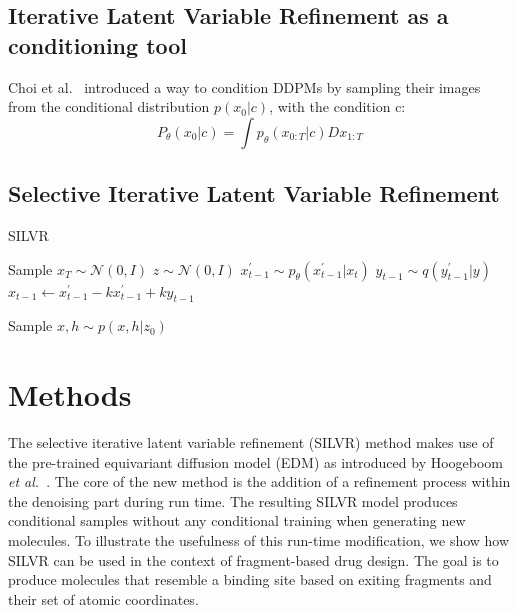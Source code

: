 \documentclass[journal=jacsat,manuscript=article]{achemso}
\begin{document}
\subsection{Iterative Latent Variable Refinement as a conditioning tool}
Choi et al.~\cite{choi2021ilvr} introduced a way to condition DDPMs by sampling their images from the conditional distribution $p(x_0|c)$, with the condition c:
\begin{equation}
    P_\theta(x_0|c) = \int p_\theta(x_{0:T}|c)Dx_{1:T}
\end{equation}

\subsection{Selective Iterative Latent Variable Refinement}

\begin{algorithm}
\caption{SILVR}\label{alg:cap}
\begin{algorithmic}
\State Sample $x_T \sim \mathcal{N}(0,I)$
    \State $z \sim \mathcal{N}(0,I)$
    \State $x_{t-1}^\prime \sim p_\theta(x_{t-1}^\prime|x_t)$
    \State $y_{t-1} \sim q(y_{t-1}^\prime|y)$
    \State $x_{t-1} \gets x_{t-1}^\prime - k x_{t-1}^\prime +k y_{t-1}$ 

\EndFor
\State Sample $x,h \sim p(x,h|z_0)$ 
\end{algorithmic}
\end{algorithm}















\section{Methods}
The selective iterative latent variable refinement (SILVR) method makes use of the pre-trained equivariant diffusion model (EDM) as introduced by Hoogeboom \textit{et al.}~\cite{hoogeboom2022equivariant}. The core of the new method is the addition of a refinement process within the denoising part during run time. The resulting SILVR model produces conditional samples without any conditional training when generating new molecules. To illustrate the usefulness of this run-time modification, we show how SILVR can be used in the context of fragment-based drug design. The goal is to produce molecules that resemble a binding site based on exiting fragments and their set of atomic coordinates. 
\end{document}
